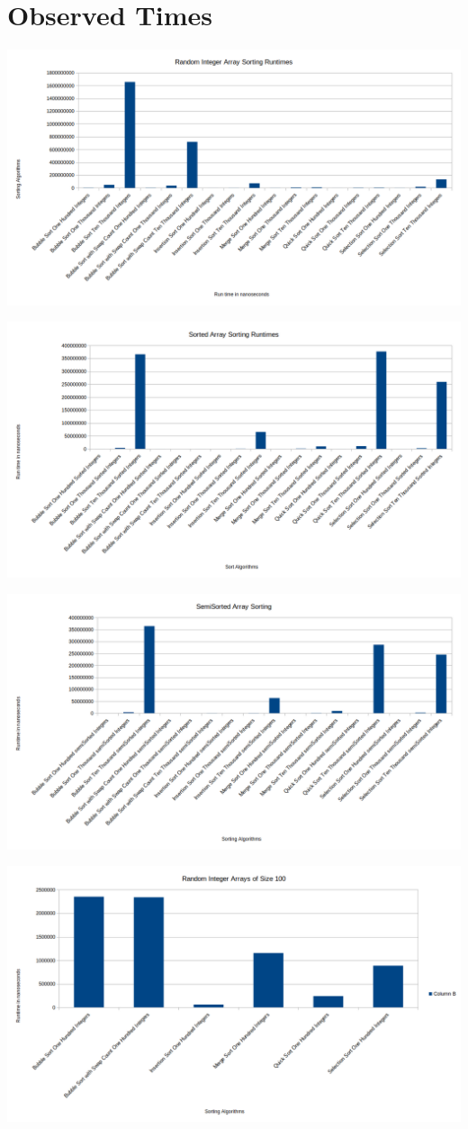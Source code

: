 \documentclass[]{article}
\begin{document}
\section{Observed Times}
\centerline{\includegraphics[scale=.7]{randomIntegerTimes}}
\centerline{\includegraphics[scale=.7]{sorted}}
\centerline{\includegraphics[scale=.7]{semisorted}}
\centerline{\includegraphics[scale=.5]{random100}}
\end{document}
